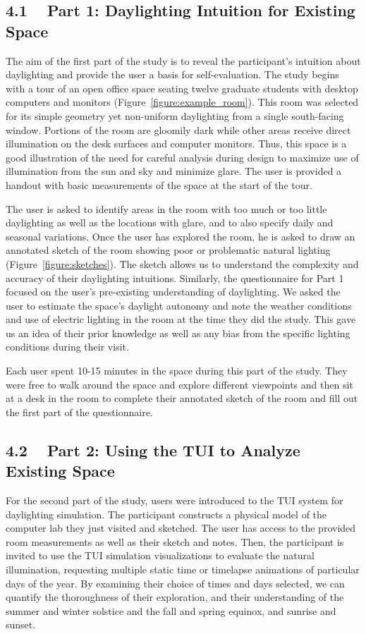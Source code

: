 \documentclass{article}
\begin{document}
\subsection{4.1 ~ Part 1: Daylighting Intuition for Existing Space}

The aim of the first part of the study is to reveal the participant's
intuition about daylighting and provide the user a basis for
self-evaluation.  The study begins with a tour of an open office space
seating twelve graduate students with desktop computers and monitors
(Figure~\ref{figure:example_room}).  This room was selected for its
simple geometry yet non-uniform daylighting from a single south-facing
window.  Portions of the room are gloomily dark while other areas
receive direct illumination on the desk surfaces and computer
monitors.  Thus, this space is a good illustration of the need for
careful analysis during design to maximize use of illumination from
the sun and sky and minimize glare.  The user is provided a handout
with basic measurements of the space at the start of the tour.

The user is asked to identify areas in the room with too much or too
little daylighting as well as the locations with glare, and to also
specify daily and seasonal variations.  Once the user has explored the
room, he is asked to draw an annotated sketch of the room showing poor
or problematic natural lighting (Figure~\ref{figure:sketches}).  The
sketch allows us to understand the complexity and accuracy of their
daylighting intuitions.  Similarly, the questionnaire for Part 1
focused on the user's pre-existing understanding of daylighting.  We
asked the user to estimate the space's daylight autonomy and note the
weather conditions and use of electric lighting in the room at the
time they did the study.  This gave us an idea of their prior
knowledge as well as any bias from the specific lighting conditions
during their visit.

Each user spent 10-15 minutes in the space during this part of the
study.  They were free to walk around the space and explore different
viewpoints and then sit at a desk in the room to complete their
annotated sketch of the room and fill out the first part of the
questionnaire.


\subsection{4.2 ~ Part 2: Using the TUI to Analyze Existing Space}

For the second part of the study, users were introduced to the TUI
system for daylighting simulation.  The participant constructs a
physical model of the computer lab they just visited and sketched.
The user has access to the provided room measurements as well as their
sketch and notes.  Then, the participant is invited to use the TUI
simulation visualizations to evaluate the natural illumination,
requesting multiple static time or timelapse animations of particular
days of the year.  By examining their choice of times and days
selected, we can quantify the thoroughness of their exploration, and
their understanding of the summer and winter solstice and the fall and
spring equinox, and sunrise and sunset.
\end{document}
